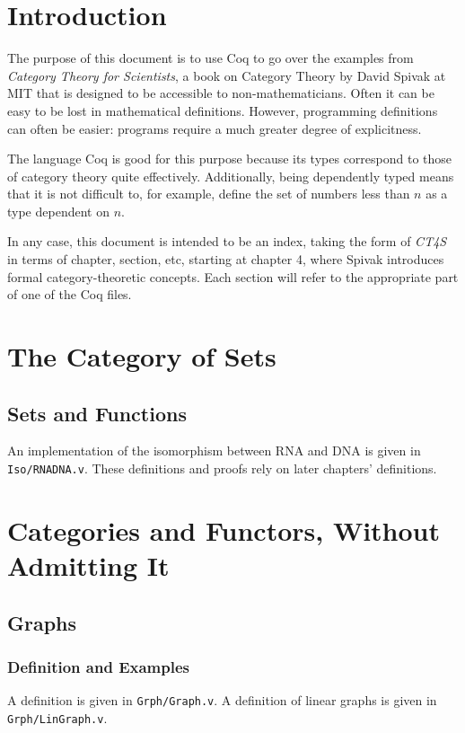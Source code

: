 \documentclass[12pt,twocolumn,oneside]{book}
\begin{document}
\setcounter{secnumdepth}{5}

\newcommand{\see}[2]{
        See \texttt{#1}, the line starting with \texttt{#2}.
    }
\newcommand{\reference}[4]{
        #1{#2} \see{#3}{#4}
    }

\chapter*{Introduction}

The purpose of this document is to use Coq to go over the examples from
\emph{Category Theory for Scientists}, a book on Category Theory by David
Spivak at MIT that is designed to be accessible to non-mathematicians. Often it
can be easy to be lost in mathematical definitions. However, programming definitions
can often be easier: programs require a much greater degree of explicitness.

The language Coq is good for this purpose because its types correspond to those
of category theory quite effectively. Additionally, being dependently typed means
that it is not difficult to, for example, define the set of numbers less than $n$
as a type dependent on $n$.

In any case, this document is intended to be an index, taking the form of \emph{CT4S}
in terms of chapter, section, etc, starting at chapter 4, where Spivak introduces
formal category-theoretic concepts. Each section will refer to the appropriate
part of one of the Coq files.

\setcounter{chapter}{1}
\chapter{The Category of Sets}
\section{Sets and Functions}
An implementation of the isomorphism between RNA and DNA is given in \texttt{Iso/RNADNA.v}. These
definitions and proofs rely on later chapters' definitions.

\chapter{Categories and Functors, Without Admitting It}
\setcounter{section}{2}
\section{Graphs}
\subsection{Definition and Examples}
A definition is given in \texttt{Grph/Graph.v}. A definition of linear graphs is
given in \texttt{Grph/LinGraph.v}.
\end{document}
